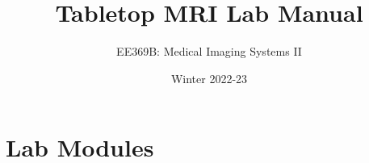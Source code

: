 \documentclass[letterpaper,12pt]{article}
\begin{document}
\title{Tabletop MRI Lab Manual}
\author{EE369B: Medical Imaging Systems II}
\date{Winter 2022-23}

\maketitle

\tableofcontents





\newpage
\section{Lab Modules}






%
\end{document}
